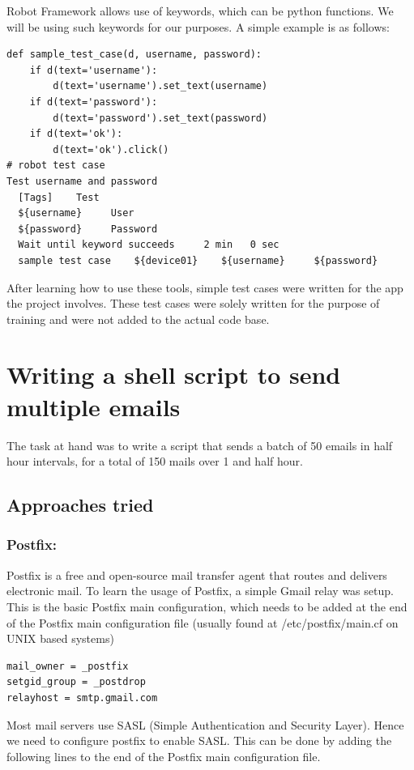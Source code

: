 Robot Framework allows use of keywords, which can be python functions. We will be using such keywords for our purposes. A simple example is as follows:

\begin{lstlisting}[style=PyStyle]
def sample_test_case(d, username, password):
	if d(text='username'):
		d(text='username').set_text(username)
	if d(text='password'):
		d(text='password').set_text(password)
	if d(text='ok'):
		d(text='ok').click()	
# robot test case
Test username and password
  [Tags]    Test
  ${username}     User
  ${password}     Password
  Wait until keyword succeeds     2 min   0 sec   
  sample test case    ${device01}    ${username}     ${password}
\end{lstlisting}
After learning how to use these tools, simple test cases were written for the app the project involves. These test cases were solely written for the purpose of training and were not added to the actual code base. 

\section{Writing a shell script to send multiple emails} 
The task at hand was to write a script that sends a batch of 50 emails in half hour intervals, for a total of 150 mails over 1 and half hour. \\

\subsection{Approaches tried}

\subsubsection{Postfix:} Postfix is a free and open-source mail transfer agent that routes and delivers electronic mail. To learn the usage of Postfix, a simple Gmail relay was setup. This is the basic Postfix main configuration, which needs to be added at the end of the Postfix main configuration file (usually found at /etc/postfix/main.cf on UNIX based systems)

\begin{lstlisting}[style=ShellStyle]
mail_owner = _postfix
setgid_group = _postdrop
relayhost = smtp.gmail.com
\end{lstlisting} 

Most mail servers use SASL (Simple Authentication and Security Layer). Hence we need to configure postfix to enable SASL. This can be done by adding the following lines to the end of the Postfix main configuration file. 

